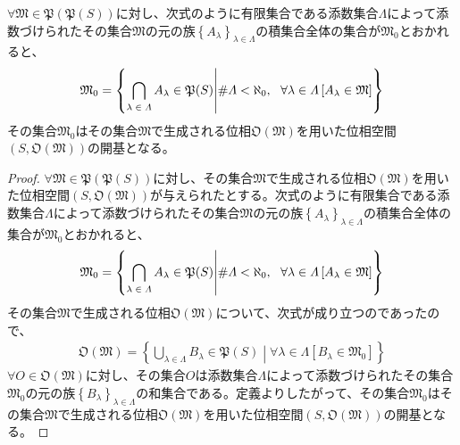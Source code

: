 \documentclass[dvipdfmx]{jsarticle}
\begin{document}
\begin{thm}\label{8.1.2.7}
$\mathfrak{\forall M \in P}\left( \mathfrak{P}(S) \right)$に対し、次式のように有限集合である添数集合$\varLambda$によって添数づけられたその集合$\mathfrak{M}の元の族\left\{ A_{\lambda} \right\}_{\lambda \in \varLambda}$の積集合全体の集合が$\mathfrak{M}_{0}$とおかれると、
\begin{align*}
\mathfrak{M}_{0} = \left\{ \bigcap_{\scriptsize \begin{matrix}
\lambda \in \varLambda \\
\end{matrix}} A_{\lambda}\in \mathfrak{P}(S) \middle| {\#}\varLambda < \aleph_{0},\ \ \forall\lambda \in \varLambda\left[ A_{\lambda}\in \mathfrak{M} \right] \right\}
\end{align*}
その集合$\mathfrak{M}_{0}$はその集合$\mathfrak{M}$で生成される位相$\mathfrak{O}\left( \mathfrak{M} \right)$を用いた位相空間$\left( S,\mathfrak{O}\left( \mathfrak{M} \right) \right)$の開基となる。
\end{thm}
\begin{proof}
$\mathfrak{\forall M \in P}\left( \mathfrak{P}(S) \right)$に対し、その集合$\mathfrak{M}$で生成される位相$\mathfrak{O}\left( \mathfrak{M} \right)$を用いた位相空間$\left( S,\mathfrak{O}\left( \mathfrak{M} \right) \right)$が与えられたとする。次式のように有限集合である添数集合$\varLambda$によって添数づけられたその集合$\mathfrak{M}$の元の族$\left\{ A_{\lambda} \right\}_{\lambda \in \varLambda}$の積集合全体の集合が$\mathfrak{M}_{0}$とおかれると、
\begin{align*}
\mathfrak{M}_{0} = \left\{ \bigcap_{\scriptsize \begin{matrix}
\lambda \in \varLambda \\
\end{matrix}} A_{\lambda}\in \mathfrak{P}(S) \middle| {\#}\varLambda < \aleph_{0},\ \ \forall\lambda \in \varLambda\left[ A_{\lambda}\in \mathfrak{M} \right] \right\}
\end{align*}
その集合$\mathfrak{M}$で生成される位相$\mathfrak{O}\left( \mathfrak{M} \right)$について、次式が成り立つのであったので、
\begin{align*}
\mathfrak{O}\left( \mathfrak{M} \right) = \left\{ \bigcup_{\lambda \in \varLambda} B_{\lambda}\in \mathfrak{P}(S) \middle| \forall\lambda \in \varLambda\left[ B_{\lambda} \in \mathfrak{M}_{0} \right] \right\}
\end{align*}
$\forall O \in \mathfrak{O}\left( \mathfrak{M} \right)$に対し、その集合$O$は添数集合$\varLambda$によって添数づけられたその集合$\mathfrak{M}_{0}$の元の族$\left\{ B_{\lambda} \right\}_{\lambda \in \varLambda}$の和集合である。定義よりしたがって、その集合$\mathfrak{M}_{0}$はその集合$\mathfrak{M}$で生成される位相$\mathfrak{O}\left( \mathfrak{M} \right)$を用いた位相空間$\left( S,\mathfrak{O}\left( \mathfrak{M} \right) \right)$の開基となる。
\end{proof}
\end{document}
